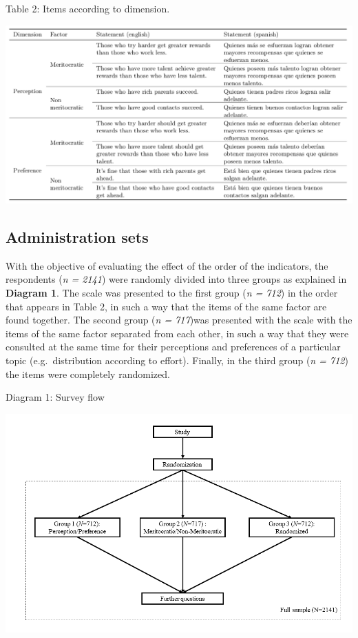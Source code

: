 \documentclass[
]{article}
\begin{document}
Table 2: Items according to dimension.

\includegraphics{../input/images/tabla2.png}

\hypertarget{administration-sets}{%
\subsection{Administration sets}\label{administration-sets}}

With the objective of evaluating the effect of the order of the
indicators, the respondents (\emph{n = 2141}) were randomly divided into
three groups as explained in \textbf{Diagram 1}. The scale was presented
to the first group (\emph{n = 712}) in the order that appears in Table
2, in such a way that the items of the same factor are found together.
The second group (\emph{n = 717})was presented with the scale with the
items of the same factor separated from each other, in such a way that
they were consulted at the same time for their perceptions and
preferences of a particular topic (e.g.~distribution according to
effort). Finally, in the third group (\emph{n = 712}) the items were
completely randomized.

Diagram 1: Survey flow

\includegraphics{../input/images/app_mod.png}
\end{document}
